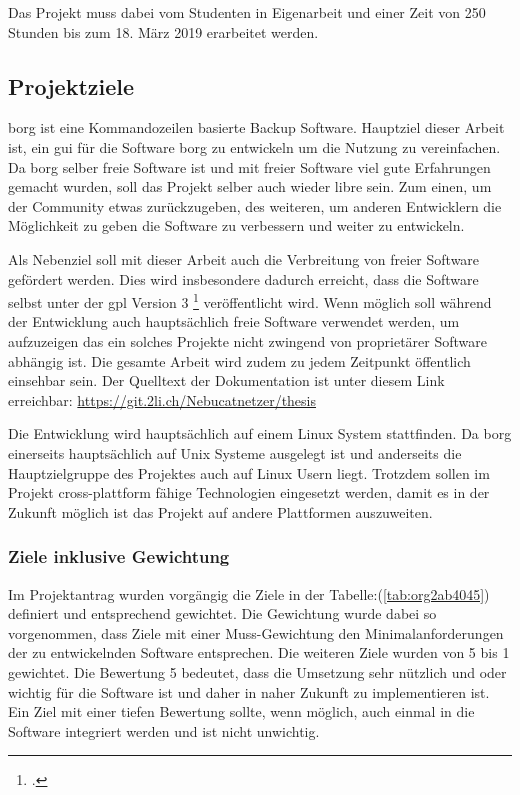 Das Projekt muss dabei vom Studenten in Eigenarbeit und einer Zeit von 250
Stunden bis zum 18. März 2019 erarbeitet werden.

\subsection{Projektziele}
\label{sec:org3d20026}

\gls{borg} ist eine Kommandozeilen basierte Backup Software. Hauptziel dieser
Arbeit ist, ein \gls{gui} für die Software \gls{borg} zu entwickeln um die Nutzung
zu vereinfachen. Da \gls{borg} selber freie Software ist und mit freier Software
viel gute Erfahrungen gemacht wurden, soll das Projekt selber auch wieder
\gls{libre} sein. Zum einen, um der Community etwas zurückzugeben, des weiteren,
um anderen Entwicklern die Möglichkeit zu geben die Software zu verbessern und
weiter zu entwickeln.

Als Nebenziel soll mit dieser Arbeit auch die Verbreitung von freier
Software gefördert werden. Dies wird insbesondere dadurch erreicht, dass die
Software selbst unter der \gls{gpl} Version 3 \footcite{gplv3} veröffentlicht wird.
Wenn möglich soll während der Entwicklung auch hauptsächlich freie Software
verwendet werden, um aufzuzeigen das ein solches Projekte nicht zwingend von
proprietärer Software abhängig ist. Die gesamte Arbeit wird zudem zu jedem
Zeitpunkt öffentlich einsehbar sein. Der Quelltext der Dokumentation ist unter
diesem Link erreichbar: \url{https://git.2li.ch/Nebucatnetzer/thesis}

Die Entwicklung wird hauptsächlich auf einem Linux System stattfinden. Da
\gls{borg} einerseits hauptsächlich auf Unix Systeme ausgelegt ist und anderseits
die Hauptzielgruppe des Projektes auch auf Linux Usern liegt. Trotzdem sollen
im Projekt cross-plattform fähige Technologien eingesetzt werden, damit es in
der Zukunft möglich ist das Projekt auf andere Plattformen auszuweiten.

\subsubsection{Ziele inklusive Gewichtung}
\label{sec:org2ef9c2b}

Im Projektantrag wurden vorgängig die Ziele in der
Tabelle:(\ref{tab:org2ab4045}) definiert und entsprechend
gewichtet. Die Gewichtung wurde dabei so vorgenommen, dass Ziele mit einer
Muss-Gewichtung den Minimalanforderungen der zu entwickelnden Software
entsprechen. Die weiteren Ziele wurden von 5 bis 1 gewichtet. Die Bewertung 5
bedeutet, dass die Umsetzung sehr nützlich und oder wichtig für die Software
ist und daher in naher Zukunft zu implementieren ist. Ein Ziel mit einer tiefen
Bewertung sollte, wenn möglich, auch einmal in die Software integriert werden
und ist nicht unwichtig.

